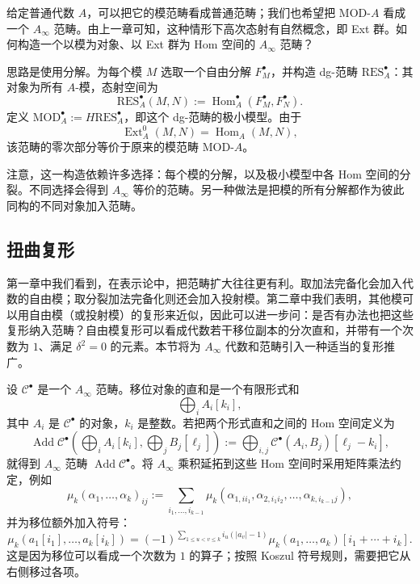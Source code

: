 \begin{example}\label{ex:module-category-ainfty}
给定普通代数 $A$，可以把它的模范畴看成普通范畴；我们也希望把 $\mathrm{MOD}\text{-}A$ 看成一个 $A_\infty$ 范畴。由上一章可知，这种情形下高次态射有自然概念，即 Ext 群。如何构造一个以模为对象、以 Ext 群为 Hom 空间的 $A_\infty$ 范畴？

思路是使用分解。为每个模 $M$ 选取一个自由分解 $F_M^\bullet$，并构造 dg-范畴 $\mathrm{RES}_A^\bullet$：其对象为所有 $A$-模，态射空间为
\[
  \mathrm{RES}_A^\bullet(M,N)
  :=\operatorname{Hom}_A^\bullet(F_M^\bullet,F_N^\bullet).
\]
定义 $\mathrm{MOD}_A^\bullet:=H\mathrm{RES}_A^\bullet$，即这个 dg-范畴的极小模型。由于
\[
  \operatorname{Ext}_A^0(M,N)=\operatorname{Hom}_A(M,N),
\]
该范畴的零次部分等价于原来的模范畴 $\mathrm{MOD}\text{-}A$。

注意，这一构造依赖许多选择：每个模的分解，以及极小模型中各 Hom 空间的分裂。不同选择会得到 $A_\infty$ 等价的范畴。另一种做法是把模的所有分解都作为彼此同构的不同对象加入范畴。
\end{example}

\subsection{扭曲复形}\label{subsec:twisted-complexes}
第一章中我们看到，在表示论中，把范畴扩大往往更有利。取加法完备化会加入代数的自由模；取分裂加法完备化则还会加入投射模。第二章中我们表明，其他模可以用自由模（或投射模）的复形来近似，因此可以进一步问：是否有办法也把这些复形纳入范畴？自由模复形可以看成代数若干移位副本的分次直和，并带有一个次数为 $1$、满足 $\delta^2=0$ 的元素。本节将为 $A_\infty$ 代数和范畴引入一种适当的复形推广。

设 $\mathcal C^\bullet$ 是一个 $A_\infty$ 范畴。移位对象的直和是一个有限形式和
\[
  \bigoplus_i A_i[k_i],
\]
其中 $A_i$ 是 $\mathcal C^\bullet$ 的对象，$k_i$ 是整数。若把两个形式直和之间的 Hom 空间定义为
\[
  \operatorname{Add}\mathcal C^\bullet
  \left(\bigoplus_iA_i[k_i],\bigoplus_jB_j[\ell_j]\right)
  :=
  \bigoplus_{i,j}\mathcal C^\bullet(A_i,B_j)[\ell_j-k_i],
\]
就得到 $A_\infty$ 范畴 $\operatorname{Add}\mathcal C^\bullet$。将 $A_\infty$ 乘积延拓到这些 Hom 空间时采用矩阵乘法约定，例如
\[
  \mu_k(\alpha_1,\ldots,\alpha_k)_{ij}
  :=
  \sum_{i_1,\ldots,i_{k-1}}
  \mu_k(\alpha_{1,ii_1},\alpha_{2,i_1i_2},\ldots,
        \alpha_{k,i_{k-1}j}),
\]
并为移位额外加入符号：
\[
  \mu_k(a_1[i_1],\ldots,a_k[i_k])
  =
  (-1)^{\sum_{1\leq u<v\leq k}i_u(|a_v|-1)}
  \mu_k(a_1,\ldots,a_k)[i_1+\cdots+i_k].
\]
这是因为移位可以看成一个次数为 $1$ 的算子；按照 Koszul 符号规则，需要把它从右侧移过各项。


